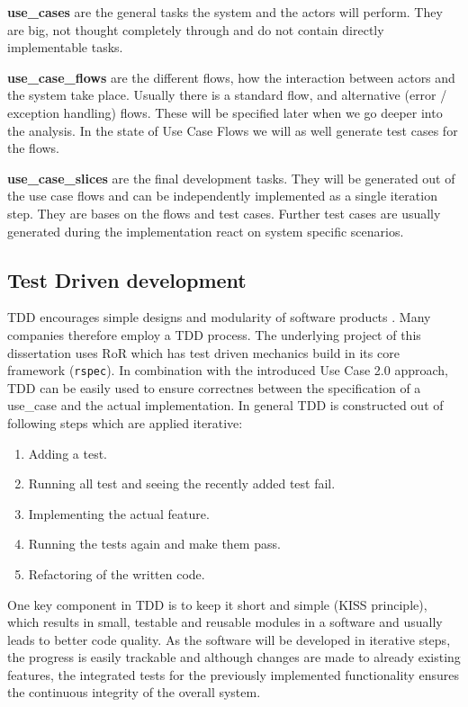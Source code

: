 \textbf{\Glspl{use_case}} are the general tasks the system and the actors will perform. They are big, not thought completely through and do not contain directly implementable tasks.

\textbf{\Glspl{use_case_flow}} are the different flows, how the interaction between actors and the system take place. Usually there is a standard flow, and alternative (error / exception handling) flows. These will be specified later when we go deeper into the analysis. In the state of Use Case Flows we will as well generate test cases for the flows. 

\textbf{\Glspl{use_case_slice}} are the final development tasks. They will be generated out of the use case flows and can be independently implemented as a single iteration step. They are bases on the flows and test cases. Further test cases are usually generated during the implementation react on system specific scenarios.


\subsection{Test Driven development}
\label{sec:tdd}
\Gls{TDD} encourages simple designs and modularity of software products \cite{tdd}. Many companies therefore employ a \gls{TDD} process. The underlying project of this dissertation uses \gls{RoR} which has test driven mechanics build in its core framework (\texttt{rspec}). In combination with the introduced Use Case 2.0 approach, \gls{TDD} can be easily used to ensure correctnes between the specification of a \gls{use_case} and the actual implementation. In general \gls{TDD} is constructed out of following steps which are applied iterative: 

\bigskip

\begin{enumerate}
	\item Adding a test.
	\item Running all test and seeing the recently added test fail.
	\item Implementing the actual feature.
	\item Running the tests again and make them pass.
	\item Refactoring of the written code.
\end{enumerate}

\bigskip

One key component in \gls{TDD} is to keep it short and simple (KISS principle), which results in small, testable and reusable modules in a software and usually leads to better code quality. As the software will be developed in iterative steps, the progress is easily trackable and although changes are made to already existing features, the integrated tests for the previously implemented functionality ensures the continuous integrity of the overall system.  

